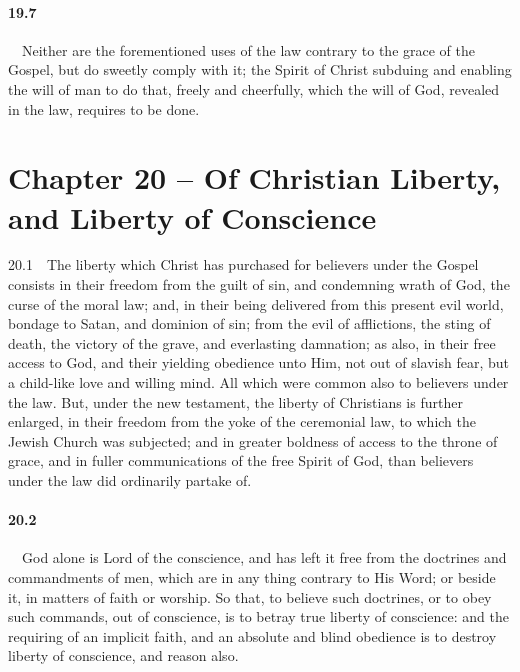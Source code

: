 \paragraph{19.7}\ \ Neither are the forementioned uses of the law contrary to the grace of the Gospel, but do sweetly comply with it; the Spirit of Christ subduing and enabling the will of man to do that, freely and cheerfully, which the will of God, revealed in the law, requires to be done.

\section{Chapter 20 -- Of Christian Liberty, and Liberty of Conscience} 20.1\ \ The liberty which Christ has purchased for believers under the Gospel consists in their freedom from the guilt of sin, and condemning wrath of God, the curse of the moral law; and, in their being delivered from this present evil world, bondage to Satan, and dominion of sin; from the evil of afflictions, the sting of death, the victory of the grave, and everlasting damnation; as also, in their free access to God, and their yielding obedience unto Him, not out of slavish fear, but a child-like love and willing mind. All which were common also to believers under the law. But, under the new testament, the liberty of Christians is further enlarged, in their freedom from the yoke of the ceremonial law, to which the Jewish Church was subjected; and in greater boldness of access to the throne of grace, and in fuller communications of the free Spirit of God, than believers under the law did ordinarily partake of.   
\bigskip
\paragraph{20.2}\ \ God alone is Lord of the conscience, and has left it free from the doctrines and commandments of men, which are in any thing contrary to His Word; or beside it, in matters of faith or worship. So that, to believe such doctrines, or to obey such commands, out of conscience, is to betray true liberty of conscience: and the requiring of an implicit faith, and an absolute and blind obedience is to destroy liberty of conscience, and reason also.   
\bigskip
